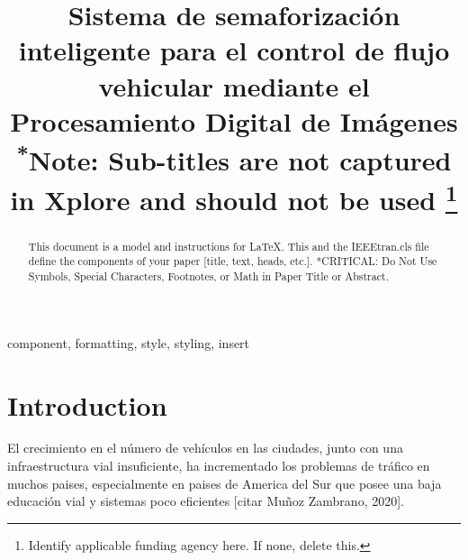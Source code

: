 \documentclass[conference]{IEEEtran}
\begin{document}
\title{Sistema de semaforización inteligente para el control de flujo vehicular mediante el Procesamiento Digital de Imágenes\\
{\footnotesize \textsuperscript{*}Note: Sub-titles are not captured in Xplore and
should not be used}
\thanks{Identify applicable funding agency here. If none, delete this.}
}
\author{
	\and
{}
\and
{}
}

\maketitle

\begin{abstract}
This document is a model and instructions for \LaTeX.
This and the IEEEtran.cls file define the components of your paper [title, text, heads, etc.]. *CRITICAL: Do Not Use Symbols, Special Characters, Footnotes, 
or Math in Paper Title or Abstract.
\end{abstract}

\begin{IEEEkeywords}
component, formatting, style, styling, insert
\end{IEEEkeywords}

\section{Introduction}
El crecimiento en el número de vehículos en las ciudades, junto con una infraestructura vial insuficiente, ha incrementado los problemas de tráfico en muchos paises, especialmente en paises de America del Sur que posee una baja educación vial y sistemas poco eficientes [citar Muñoz Zambrano, 2020].
\end{document}
